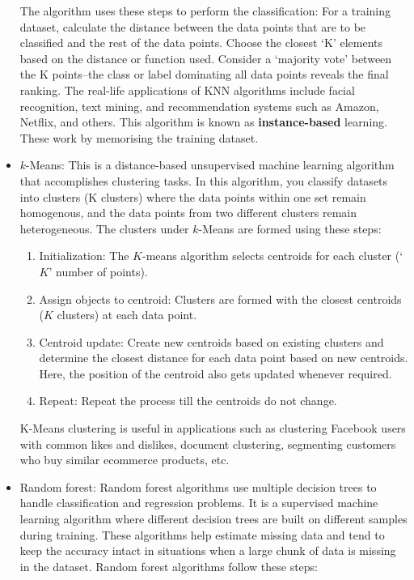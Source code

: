 \documentclass[11pt]{article}
\begin{document}
\begin{itemize}
The algorithm uses these steps to perform the classification:
For a training dataset, calculate the distance between the data points that are to be classified and the rest of the data points.
Choose the closest ‘K’ elements based on the distance or function used.
Consider a ‘majority vote’ between the K points–the class or label dominating all data points reveals the final ranking. 
The real-life applications of KNN algorithms include facial recognition, text mining, and recommendation systems such as Amazon, Netflix, and others.
This algorithm is known as \textbf{instance-based} learning. These work by memorising the training dataset. 

\item $k$-Means: This is a distance-based unsupervised machine learning algorithm that accomplishes clustering tasks. In this algorithm, you classify datasets into clusters (K clusters) where the data 
points within one set remain homogenous, and the data points from two different clusters remain heterogeneous. The clusters under $k$-Means are formed using these steps:
\begin{enumerate} 
\item Initialization: The $K$-means algorithm selects centroids for each cluster (‘$K$’ number of points).
\item Assign objects to centroid: Clusters are formed with the closest centroids ($K$ clusters) at each data point.
\item Centroid update: Create new centroids based on existing clusters and determine the closest distance for each data point based on new centroids. Here, the position of the centroid also gets updated whenever required.
\item Repeat: Repeat the process till the centroids do not change.
\end{enumerate} 
K-Means clustering is useful in applications such as clustering Facebook users with common likes and dislikes, document clustering, segmenting customers who buy similar ecommerce products, etc.
\item Random forest: Random forest algorithms use multiple decision trees to handle classification and regression problems. It is a supervised machine learning algorithm where different decision trees are built on different samples during training. These algorithms help estimate missing data and tend to keep the accuracy intact in situations when a large chunk of data is missing in the dataset. Random forest algorithms follow these steps:


\end{itemize}
\end{document}
